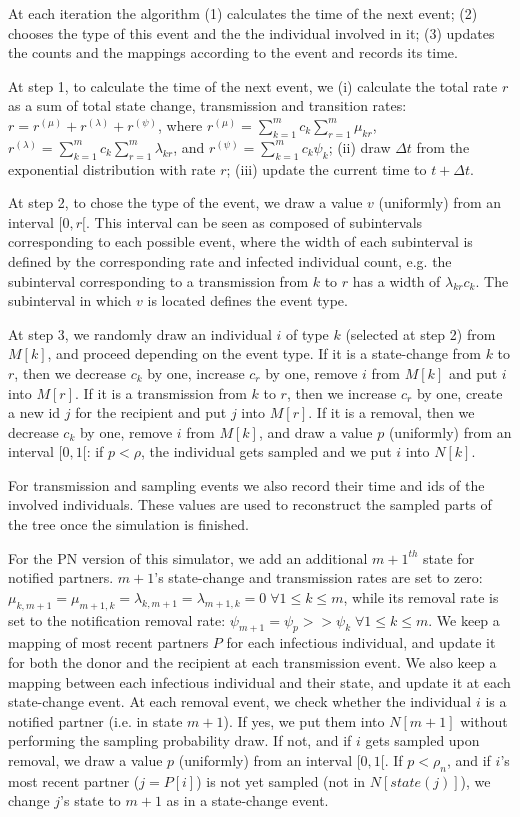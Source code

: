 \documentclass[a4paper,10pt]{article}
\begin{document}
At each iteration the algorithm (1) calculates the time of the next event; (2) chooses the type of this event and the the individual involved in it; (3) updates the counts and the mappings according to the event and records its time.

At step 1, to calculate the time of the next event, we (i) calculate the total rate $r$ as a sum of total state change, transmission and transition rates: $r = r^{(\mu)} + r^{(\lambda)} + r^{(\psi)}$, where $r^{(\mu)} = \sum\limits_{k=1}^{m} c_k \sum\limits_{r=1}^{m} \mu_{kr}$, $r^{(\lambda)} = \sum\limits_{k=1}^{m} c_k \sum\limits_{r=1}^{m} \lambda_{kr}$, and $r^{(\psi)} = \sum\limits_{k=1}^{m} c_k \psi_{k}$; (ii) draw $\Delta t$ from the exponential distribution with rate $r$; (iii) update the current time to $t + \Delta t$.

At step 2, to chose the type of the event, we draw a value $v$ (uniformly) from an interval $[0, r[$. This interval can be seen as composed of subintervals corresponding to each possible event, where the width of each subinterval is defined by the corresponding rate and infected individual count, e.g. the subinterval corresponding to a transmission from $k$ to $r$ has a width of $\lambda_{kr}c_k$. The subinterval in which $v$ is located defines the event type.

At step 3, we randomly draw an individual $i$ of type $k$ (selected at step 2) from $M[k]$, and proceed depending on the event type. If it is a state-change from $k$ to $r$, then we decrease $c_k$ by one, increase $c_r$ by one, remove $i$ from $M[k]$ and put $i$ into $M[r]$. If it is a transmission from $k$ to $r$, then we increase $c_r$ by one, create a new id $j$ for the recipient and put $j$ into $M[r]$. If it is a removal, then we decrease $c_k$ by one, remove $i$ from $M[k]$, and draw a value $p$ (uniformly) from an interval $[0, 1[$: if $p < \rho$, the individual gets sampled and we put $i$ into $N[k]$. 

For transmission and sampling events we also record their time and ids of the involved individuals. These values are used to reconstruct the sampled parts of the tree once the simulation is finished.


For the PN version of this simulator, we add an additional $m+1^{th}$ state for notified partners. $m + 1$'s state-change and transmission rates are set to zero: $\mu_{k,m+1} = \mu_{m+1,k} = \lambda_{k,m+1} = \lambda_{m+1,k} = 0\; \forall 1 \leq k \leq m$, while its removal rate is set to the notification removal rate: $\psi_{m+1} = \psi_p >> \psi_k\; \forall 1 \leq k \leq m$. We keep a mapping of most recent partners $P$ for each infectious individual, and update it for both the donor and the recipient at each transmission event. We also keep a mapping between each infectious individual and their state, and update it at each state-change event. At each removal event, we check whether the individual $i$ is a notified partner (i.e. in state $m+1$). If yes, we put them into $N[m+1]$ without performing the sampling probability draw. If not, and if $i$ gets sampled upon removal, we draw a value $p$ (uniformly) from an interval $[0, 1[$. If $p < \rho_n$, and if $i$'s most recent partner ($j = P[i]$) is not yet sampled (not in $N[state(j)]$), we change $j$'s state to $m + 1$ as in a state-change event.
\end{document}
